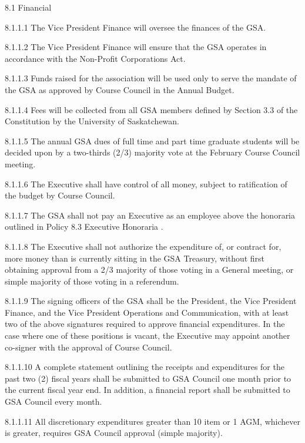 ﻿8.1 Financial 
 
 
 
 8.1.1.1 The Vice President Finance will oversee the finances of the 
 GSA. 
 
 8.1.1.2 The Vice President Finance will ensure that the GSA operates 
 in accordance with the Non-Profit Corporations Act. 
 
 8.1.1.3 Funds raised for the association will be used only to serve the 
 mandate of the GSA as approved by Course Council in the Annual 
 Budget. 
 
 8.1.1.4 Fees will be collected from all GSA members defined by 
 Section 3.3 of the Constitution by the University of Saskatchewan. 
 
 8.1.1.5 The annual GSA dues of full time and part time graduate 
 students will be decided upon by a two-thirds (2/3) majority vote at 
 the February Course Council meeting. 
 
 8.1.1.6 The Executive shall have control of all money, subject to 
 ratification of the budget by Course Council. 
 
 8.1.1.7 The GSA shall not pay an Executive as an employee above the 
 honoraria outlined in Policy 8.3 Executive Honoraria . 
 
 8.1.1.8 The Executive shall not authorize the expenditure of, or 
 contract for, more money than is currently sitting in the GSA Treasury, 
 without first obtaining approval from a 2/3 majority of those voting in 
 a General meeting, or simple majority of those voting in a 
 referendum. 
 
 8.1.1.9 The signing officers of the GSA shall be the President, the Vice 
 President Finance, and the Vice President Operations and 
 Communication, with at least two of the above signatures required to 
 approve financial expenditures. In the case where one of these 
 positions is vacant, the Executive may appoint another co-signer with 
 the approval of Course Council. 
 
 8.1.1.10 A complete statement outlining the receipts and expenditures 
 for the past two (2) fiscal years shall be submitted to GSA Council one month prior to the current fiscal year end. In addition, a financial 
 report shall be submitted to GSA Council every month. 
 
 8.1.1.11 All discretionary expenditures greater than 10%
 item or 1%
 AGM, whichever is greater, requires GSA Council approval (simple 
 majority). 
 

